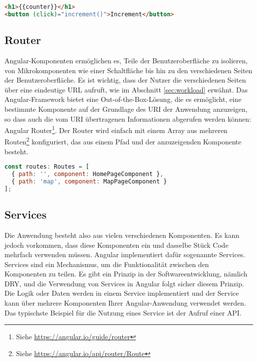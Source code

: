 \begin{lstlisting}[language=html,caption={Template der Komponente counter-increment},captionpos=b]
<h1>{{counter}}</h1>
<button (click)="increment()">Increment</button>
\end{lstlisting}

\subsection{Router}

Angular-Komponenten ermöglichen es, Teile der Benutzeroberfläche zu isolieren, von Mikrokomponenten wie einer Schaltfläche bis hin zu den verschiedenen Seiten der Benutzeroberfläche.
Es ist wichtig, dass der Nutzer die verschiedenen Seiten über eine eindeutige \ac{URL} aufruft, wie im Abschnitt \ref{sec:workload} erwähnt.
Das Angular-Framework bietet eine Out-of-the-Box-Lösung, die es ermöglicht, eine bestimmte Komponente auf der Grundlage des \ac{URI} der Anwendung anzuzeigen, so dass auch die vom \ac{URI} übertragenen Informationen abgerufen werden können: Angular Router\footnote{Siehe \href{https://angular.io/guide/router}{https://angular.io/guide/router}}.
Der Router wird einfach mit einem Array aus mehreren Routen\footnote{Siehe \href{https://angular.io/api/router/Route}{https://angular.io/api/router/Route}} konfiguriert, das aus einem Pfad und der anzuzeigenden Komponente besteht.

\begin{lstlisting}[language=javascript,caption={Router-Einstellung, mit der zwei Komponenten an zwei URIs der Anwendung angezeigt werden},captionpos=b]
const routes: Routes = [
  { path: '', component: HomePageComponent },
  { path: 'map', component: MapPageComponent }
];
\end{lstlisting}

\subsection{Services}
Die Anwendung besteht also aus vielen verschiedenen Komponenten.
Es kann jedoch vorkommen, dass diese Komponenten ein und dasselbe Stück Code mehrfach verwenden müssen.
Angular implementiert dafür sogenannte Services.
Services sind ein Mechanismus, um die Funktionalität zwischen den Komponenten zu teilen.
Es gibt ein Prinzip in der Softwareentwicklung, nämlich \ac{DRY}, und die Verwendung von Services in Angular folgt sicher diesem Prinzip.
Die Logik oder Daten werden in einem Service implementiert und der Service kann über mehrere Komponenten Ihrer Angular-Anwendung verwendet werden.
Das typischste Beispiel für die Nutzung eines Service ist der Aufruf einer API.

